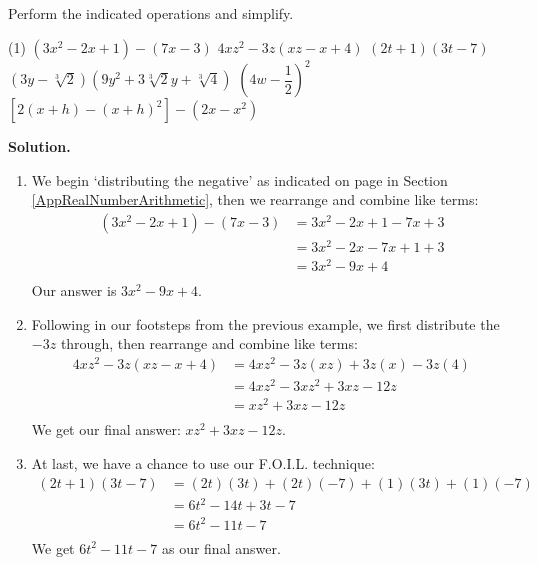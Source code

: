 \begin{ex}

\label{polyaddsubtmultex} 

Perform the indicated operations and simplify.

\begin{tasks}(1)
\task  $\left(3x^2 - 2x + 1\right) - (7x-3)$
\task  $4xz^2 - 3z(xz - x + 4)$
\task $(2t+1)(3t - 7)$ 
\task  $\left(3y - \sqrt[3]{2}\right)\left(9y^2 + 3\sqrt[3]{2} y + \sqrt[3]{4}\right)$
\task  $\left(4w - \dfrac{1}{2} \right)^2$
\task  $\left[2(x+h) - (x+h)^2\right] - \left(2x - x^2 \right)$ 
\end{tasks}

{\bf Solution.}

\begin{enumerate}

\item  We begin `distributing the negative' as indicated on page \pageref{box:propertiesofnegatives} in Section \ref{AppRealNumberArithmetic}, then we rearrange and combine like terms:
\begin{align*}
\left(3x^2 - 2x + 1\right) - (7x-3) &  = 3x^2-2x+1 - 7x + 3 \tag{Distribute} \\
                                    & = 3x^2  -2x - 7x + 1 + 3 \tag{Rearrange terms} \\
																		& = 3x^2 - 9x + 4 \tag{Combine like terms}  \\ 
\end {align*}
Our answer is $3x^2 - 9x + 4$.

\item  Following in our footsteps from the previous example, we first distribute the $-3z$ through, then rearrange and combine like terms:
\begin{align*}
4xz^2 - 3z(xz - x + 4) & = 4xz^2 - 3z(xz) + 3z (x) - 3z(4) \tag{Distribute} \\
                       & = 4xz^2 - 3xz^2 + 3xz - 12 z \tag{Multiply} \\
											 & = xz^2+ 3xz - 12 z \tag{Combine like terms} \\
\end{align*}
We get our final answer: $xz^2+ 3xz - 12z$.


\item  At last, we have a chance to use our F.O.I.L. technique:
\begin{align*}
(2t+1)(3t - 7) & = (2t)(3t) + (2t)(-7) + (1)(3t) + (1)(-7) & \tag{F.O.I.L.} \\
               & = 6t^2 - 14t + 3t - 7 \tag{Multiply} \\
							 & = 6t^2 - 11t - 7 \tag{Combine like terms} \\
\end{align*}
We get $6t^2 - 11t - 7$ as our final answer.


\end{enumerate}
\end{ex}
